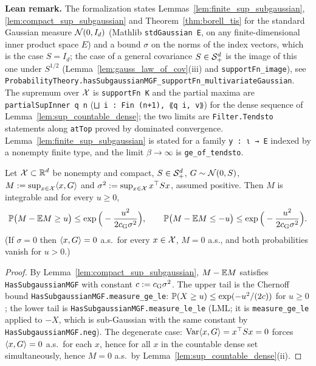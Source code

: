 \textbf{Lean remark.} The formalization states Lemmas~\ref{lem:finite_sup_subgaussian},
\ref{lem:compact_sup_subgaussian} and Theorem~\ref{thm:borell_tis} for the standard Gaussian
measure $\mathcal{N}(0, I_d)$ (Mathlib \texttt{stdGaussian E}, on any finite-dimensional inner
product space $E$) and a bound $\sigma$ on the norms of the index vectors, which is the case
$S = I_d$; the case of a general covariance $S \in \mathcal{S}_{+}^{d}$ is the image of this one under
$S^{1/2}$ (Lemma~\ref{lem:gauss_law_of_cov}(iii) and \texttt{supportFn\_image}), see
\texttt{ProbabilityTheory.hasSubgaussianMGF\_supportFn\_multivariateGaussian}. The supremum
over $\mathcal{X}$ is \texttt{supportFn K} and the partial maxima are \texttt{partialSupInner q n}
(\texttt{⨆ i : Fin (n+1), ⟪q i, v⟫}) for the dense sequence of
Lemma~\ref{lem:sup_countable_dense}; the two limits are \texttt{Filter.Tendsto} statements
along \texttt{atTop} proved by dominated convergence. Lemma~\ref{lem:finite_sup_subgaussian}
is stated for a family \texttt{y : ι → E} indexed by a nonempty finite type, and the limit
$\beta \to \infty$ is \texttt{ge\_of\_tendsto}.

\begin{theorem}\label{thm:borell_tis}
\leanok
{}
Let $\mathcal{X} \subset \mathbb{R}^d$ be nonempty and compact, $S \in \mathcal{S}_{+}^{d}$, $G \sim \mathcal{N}(0,S)$,
$M := \sup_{x\in\mathcal{X}}\langle x, G \rangle$ and $\sigma^2 := \sup_{x\in\mathcal{X}}x^\top Sx$, assumed positive.
Then $M$ is integrable and for every $u \ge 0$,
\[
  \mathbb{P}\big(M - \mathbb{E} M \ge u\big) \le \exp\Big(-\frac{u^2}{2c_{\mathrm{G}}\sigma^2}\Big), \qquad
  \mathbb{P}\big(M - \mathbb{E} M \le -u\big) \le \exp\Big(-\frac{u^2}{2c_{\mathrm{G}}\sigma^2}\Big).
\]
(If $\sigma = 0$ then $\langle x, G \rangle = 0$ a.s.\ for every $x\in\mathcal{X}$, $M = 0$ a.s., and both
probabilities vanish for $u > 0$.)
\end{theorem}

\begin{proof}
\leanok
{}
By Lemma~\ref{lem:compact_sup_subgaussian}, $M - \mathbb{E} M$ satisfies \texttt{HasSubgaussianMGF}
with constant $c := c_{\mathrm{G}}\sigma^2$. The upper tail is the Chernoff bound
\texttt{HasSubgaussianMGF.measure\_ge\_le}: $\mathbb{P}(X \ge u) \le \exp(-u^2/(2c))$ for $u \ge 0$;
the lower tail is \texttt{HasSubgaussianMGF.measure\_le\_le} (LML; it is
\texttt{measure\_ge\_le} applied to $-X$, which is sub-Gaussian with the same constant by
\texttt{HasSubgaussianMGF.neg}). The degenerate case: $\mathrm{Var}\langle x, G \rangle = x^\top Sx = 0$ forces
$\langle x, G \rangle = 0$ a.s.\ for each $x$, hence for all $x$ in the countable dense set
simultaneously, hence $M = 0$ a.s.\ by Lemma~\ref{lem:sup_countable_dense}(ii).
\end{proof}

